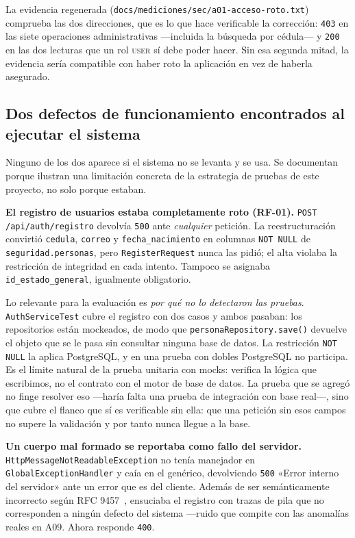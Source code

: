 \documentclass[11pt,a4paper]{article}
\newcommand{\ruta}[1]{\texttt{\footnotesize #1}}
\begin{document}
La evidencia regenerada (\ruta{docs/mediciones/sec/a01-acceso-roto.txt})
comprueba las dos direcciones, que es lo que hace verificable la
corrección: \texttt{403} en las siete operaciones administrativas
—incluida la búsqueda por cédula— y \texttt{200} en las dos lecturas que
un rol \textsc{user} sí debe poder hacer. Sin esa segunda mitad, la
evidencia sería compatible con haber roto la aplicación en vez de haberla
asegurado.

\subsection{Dos defectos de funcionamiento encontrados al ejecutar el sistema}
\label{sec:defectos-runtime}

Ninguno de los dos aparece si el sistema no se levanta y se usa. Se
documentan porque ilustran una limitación concreta de la estrategia de
pruebas de este proyecto, no solo porque estaban.

\textbf{El registro de usuarios estaba completamente roto (RF-01).}
\ruta{POST /api/auth/registro} devolvía \texttt{500} ante \emph{cualquier}
petición. La reestructuración convirtió \texttt{cedula}, \texttt{correo} y
\texttt{fecha\_nacimiento} en columnas \texttt{NOT NULL} de
\texttt{seguridad.personas}, pero \texttt{RegisterRequest} nunca las pidió;
el alta violaba la restricción de integridad en cada intento. Tampoco se
asignaba \texttt{id\_estado\_general}, igualmente obligatorio.

Lo relevante para la evaluación es \emph{por qué no lo detectaron las
pruebas}. \texttt{AuthServiceTest} cubre el registro con dos casos y ambos
pasaban: los repositorios están mockeados, de modo que
\texttt{personaRepository.save()} devuelve el objeto que se le pasa sin
consultar ninguna base de datos. La restricción \texttt{NOT NULL} la aplica
PostgreSQL, y en una prueba con dobles PostgreSQL no participa. Es el
límite natural de la prueba unitaria con mocks: verifica la lógica que
escribimos, no el contrato con el motor de base de datos. La prueba que se
agregó no finge resolver eso —haría falta una prueba de integración con
base real—, sino que cubre el flanco que sí es verificable sin ella: que
una petición sin esos campos no supere la validación y por tanto nunca
llegue a la base.

\textbf{Un cuerpo mal formado se reportaba como fallo del servidor.}
\texttt{HttpMessageNotReadableException} no tenía manejador en
\texttt{GlobalExceptionHandler} y caía en el genérico, devolviendo
\texttt{500} «Error interno del servidor» ante un error que es del cliente.
Además de ser semánticamente incorrecto según RFC 9457~\cite{rfc9457},
ensuciaba el registro con trazas de pila que no corresponden a ningún
defecto del sistema —ruido que compite con las anomalías reales en A09.
Ahora responde \texttt{400}.
\end{document}
